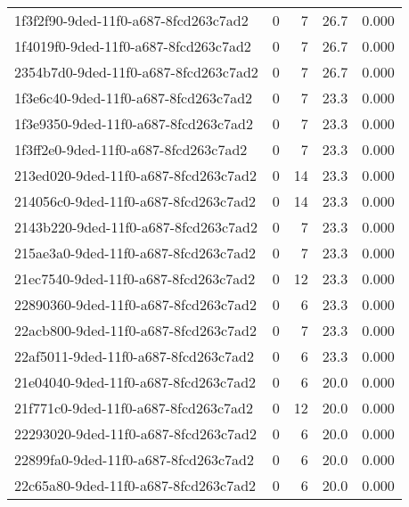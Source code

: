 \begin{longtable}{l r r r r}
1f3f2f90-9ded-11f0-a687-8fcd263c7ad2 & 0 & 7 & 26.7 & 0.000 \\

1f4019f0-9ded-11f0-a687-8fcd263c7ad2 & 0 & 7 & 26.7 & 0.000 \\

2354b7d0-9ded-11f0-a687-8fcd263c7ad2 & 0 & 7 & 26.7 & 0.000 \\

1f3e6c40-9ded-11f0-a687-8fcd263c7ad2 & 0 & 7 & 23.3 & 0.000 \\

1f3e9350-9ded-11f0-a687-8fcd263c7ad2 & 0 & 7 & 23.3 & 0.000 \\

1f3ff2e0-9ded-11f0-a687-8fcd263c7ad2 & 0 & 7 & 23.3 & 0.000 \\

213ed020-9ded-11f0-a687-8fcd263c7ad2 & 0 & 14 & 23.3 & 0.000 \\

214056c0-9ded-11f0-a687-8fcd263c7ad2 & 0 & 14 & 23.3 & 0.000 \\

2143b220-9ded-11f0-a687-8fcd263c7ad2 & 0 & 7 & 23.3 & 0.000 \\

215ae3a0-9ded-11f0-a687-8fcd263c7ad2 & 0 & 7 & 23.3 & 0.000 \\

21ec7540-9ded-11f0-a687-8fcd263c7ad2 & 0 & 12 & 23.3 & 0.000 \\

22890360-9ded-11f0-a687-8fcd263c7ad2 & 0 & 6 & 23.3 & 0.000 \\

22acb800-9ded-11f0-a687-8fcd263c7ad2 & 0 & 7 & 23.3 & 0.000 \\

22af5011-9ded-11f0-a687-8fcd263c7ad2 & 0 & 6 & 23.3 & 0.000 \\

21e04040-9ded-11f0-a687-8fcd263c7ad2 & 0 & 6 & 20.0 & 0.000 \\

21f771c0-9ded-11f0-a687-8fcd263c7ad2 & 0 & 12 & 20.0 & 0.000 \\

22293020-9ded-11f0-a687-8fcd263c7ad2 & 0 & 6 & 20.0 & 0.000 \\

22899fa0-9ded-11f0-a687-8fcd263c7ad2 & 0 & 6 & 20.0 & 0.000 \\

22c65a80-9ded-11f0-a687-8fcd263c7ad2 & 0 & 6 & 20.0 & 0.000 \\


\end{longtable}
